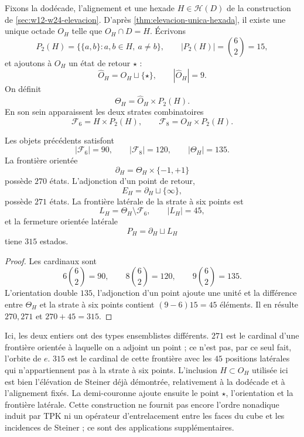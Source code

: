 Fixons la dodécade, l'alignement et une hexade
\(H\in\mathcal H(D)\) de la construction de
\cref{sec:w12-w24-elevacion}. D'après
\cref{thm:elevacion-unica-hexada}, il existe une unique octade \(O_H\) telle que
\(O_H\cap D=H\). Écrivons
\[
 P_2(H)=\{\{a,b\}:a,b\in H,\ a\ne b\},
 \qquad |P_2(H)|=\binom62=15,
\]
et ajoutons à \(O_H\) un état de retour \(\star\) :
\[
 \widehat O_H=O_H\sqcup\{\star\},
 \qquad |\widehat O_H|=9.
\]
On définit
\[
 \Theta_H=\widehat O_H\times P_2(H).
\]
En son sein apparaissent les deux strates combinatoires
\[
 \mathcal F_6=H\times P_2(H),
 \qquad
 \mathcal F_8=O_H\times P_2(H).
\]

\begin{theorem}
\label{thm:realizacion-semicorona}
Les objets précédents satisfont
\[
 |\mathcal F_6|=90,
 \qquad
 |\mathcal F_8|=120,
 \qquad
 |\Theta_H|=135.
\]
La frontière orientée
\[
 \partial_H=\Theta_H\times\{-1,+1\}
\]
possède \(270\) états. L'adjonction d'un point de retour,
\[
 E_H=\partial_H\sqcup\{\infty\},
\]
possède \(271\) états. La frontière latérale de la strate à six points est
\[
 L_H=\Theta_H\setminus\mathcal F_6,
 \qquad |L_H|=45,
\]
et la fermeture orientée latérale
\[
 P_H=\partial_H\sqcup L_H
\]
tiene \(315\) estados.
\end{theorem}

\begin{proof}
Les cardinaux sont
\[
 6\binom62=90,
 \qquad
 8\binom62=120,
 \qquad
 9\binom62=135.
\]
L'orientation double \(135\), l'adjonction d'un point ajoute une unité et
la différence entre \(\Theta_H\) et la strate à six points contient
\((9-6)15=45\) éléments. Il en résulte \(270,271\) et
\(270+45=315\).
\end{proof}

Ici, les deux entiers ont des types ensemblistes différents. \(271\) est le
cardinal d'une frontière orientée à laquelle on a adjoint un point ; ce n'est pas,
par ce seul fait, l'orbite de \(e\). \(315\) est le cardinal de cette
frontière avec les \(45\) positions latérales qui n'appartiennent pas à la
strate à six points. L'inclusion \(H\subset O_H\) utilisée ici est bien
l'élévation de Steiner déjà démontrée, relativement à la dodécade et à
l'alignement fixés. La demi-couronne ajoute ensuite le point \(\star\),
l'orientation et la frontière latérale. Cette construction ne fournit pas encore
l'ordre nonadique induit par TPK ni un opérateur d'entrelacement entre les faces du cube
et les incidences de Steiner ; ce sont des applications supplémentaires.

